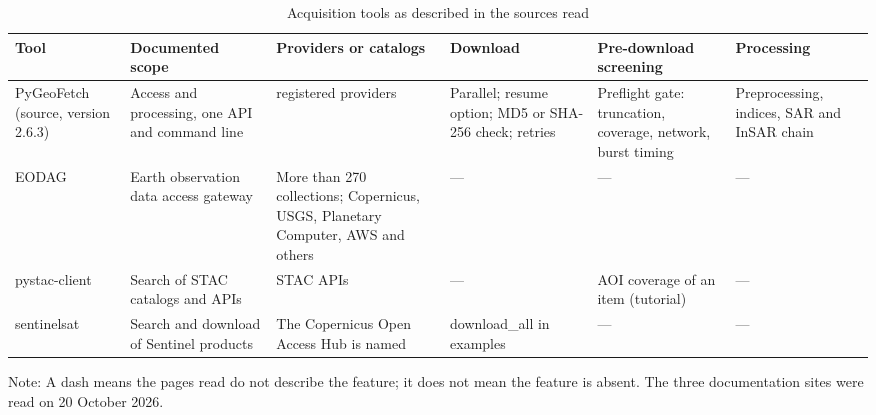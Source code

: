 \documentclass[conference]{IEEEtran}
\newlength{\tabw}
\begin{document}
\begin{table}[!t]
\caption{Acquisition tools as described in the sources read}
\centering
{\scriptsize\setlength{\tabcolsep}{2.5pt}\renewcommand{\arraystretch}{1.12}\setlength{\tabw}{\dimexpr\textwidth-12\tabcolsep\relax}
\begin{tabular}{>{\raggedright\arraybackslash}p{}>{\raggedright\arraybackslash}p{}>{\raggedright\arraybackslash}p{}>{\raggedright\arraybackslash}p{}>{\raggedright\arraybackslash}p{}>{\raggedright\arraybackslash}p{}}
\toprule
\textbf{Tool} & \textbf{Documented scope} & \textbf{Providers or catalogs} & \textbf{Download} & \textbf{Pre-download screening} & \textbf{Processing} \\
\midrule
PyGeoFetch (source, version 2.6.3) & Access and processing, one API and command line & 22 registered providers & Parallel; resume option; MD5 or SHA-256 check; retries & Preflight gate: truncation, coverage, network, burst timing & Preprocessing, indices, SAR and InSAR chain \\
EODAG \cite{eodag2026} & Earth observation data access gateway & More than 270 collections; Copernicus, USGS, Planetary Computer, AWS and others & --- & --- & --- \\
pystac-client \cite{pystacclient2026} & Search of STAC catalogs and APIs & STAC APIs & --- & AOI coverage of an item (tutorial) & --- \\
sentinelsat \cite{sentinelsat2026} & Search and download of Sentinel products & The Copernicus Open Access Hub is named & download\_\allowbreak{}all in examples & --- & --- \\
\bottomrule
\end{tabular}
\par\vspace{2pt}\begin{minipage}{\textwidth}\raggedright\scriptsize Note: A dash means the pages read do not describe the feature; it does not mean the feature is absent. The three documentation sites were read on 20 October 2026.\end{minipage}
}
\end{table}
\end{document}

